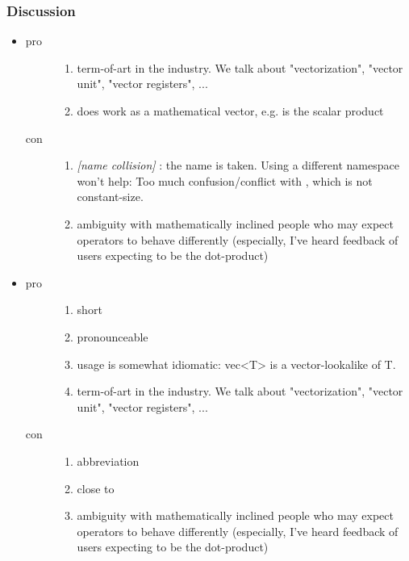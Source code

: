 \subsubsection{Discussion}

\begin{itemize}
  \item {}
    \begin{description}
      \item[pro]
        \begin{enumerate}
          \item term-of-art in the industry. We talk about "vectorization", "vector unit", "vector registers", ...
          \item does work as a mathematical vector, e.g.  is the scalar product
        \end{enumerate}
      \item[con]
        \begin{enumerate}
          \item \emph{[name collision]} : the name is taken. Using a different namespace won't help: Too much confusion/conflict with , which is not constant-size.
          \item ambiguity with mathematically inclined people who may expect operators to behave differently (especially, I've heard feedback of users expecting  to be the dot-product)
        \end{enumerate}
    \end{description}

  \item {}
    \begin{description}
      \item[pro]
        \begin{enumerate}
          \item short
          \item pronounceable
          \item usage is somewhat idiomatic: vec<T> is a vector-lookalike of T.
          \item term-of-art in the industry. We talk about "vectorization", "vector unit", "vector registers", ...
        \end{enumerate}
      \item[con]
        \begin{enumerate}
          \item abbreviation
          \item close to 
          \item ambiguity with mathematically inclined people who may expect operators to behave differently (especially, I've heard feedback of users expecting  to be the dot-product)
        \end{enumerate}
    \end{description}


\end{itemize}
